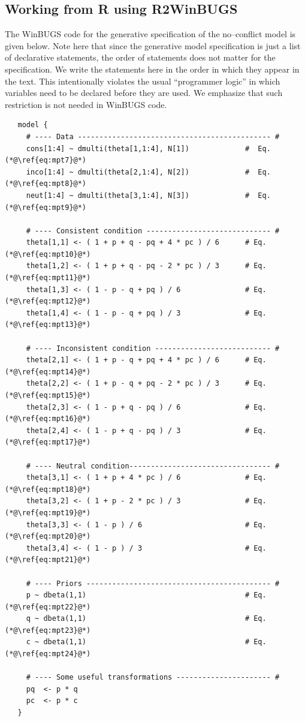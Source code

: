 \subsection{Working from R using R2WinBUGS}

The WinBUGS code for the generative specification of the no--conflict model is given below. {Note here that since the generative model specification is just a list of declarative statements, the order of statements does not matter for the specification. We write the statements here in the order in which they appear in the text. This intentionally violates the usual ``programmer logic'' in which variables need to be declared before they are used. We emphasize that such restriction is not needed in WinBUGS code.}

\begin{lstlisting}
   model {
     # ---- Data --------------------------------------------- #
     cons[1:4] ~ dmulti(theta[1,1:4], N[1])             #  Eq. (*@\ref{eq:mpt7}@*)
     inco[1:4] ~ dmulti(theta[2,1:4], N[2])             #  Eq. (*@\ref{eq:mpt8}@*)
     neut[1:4] ~ dmulti(theta[3,1:4], N[3])             #  Eq. (*@\ref{eq:mpt9}@*)
  
     # ---- Consistent condition ----------------------------- #
     theta[1,1] <- ( 1 + p + q - pq + 4 * pc ) / 6      # Eq. (*@\ref{eq:mpt10}@*)
     theta[1,2] <- ( 1 + p + q - pq - 2 * pc ) / 3      # Eq. (*@\ref{eq:mpt11}@*)
     theta[1,3] <- ( 1 - p - q + pq ) / 6               # Eq. (*@\ref{eq:mpt12}@*)
     theta[1,4] <- ( 1 - p - q + pq ) / 3               # Eq. (*@\ref{eq:mpt13}@*)
      
     # ---- Inconsistent condition --------------------------- #
     theta[2,1] <- ( 1 + p - q + pq + 4 * pc ) / 6      # Eq. (*@\ref{eq:mpt14}@*)
     theta[2,2] <- ( 1 + p - q + pq - 2 * pc ) / 3      # Eq. (*@\ref{eq:mpt15}@*)
     theta[2,3] <- ( 1 - p + q - pq ) / 6               # Eq. (*@\ref{eq:mpt16}@*)
     theta[2,4] <- ( 1 - p + q - pq ) / 3               # Eq. (*@\ref{eq:mpt17}@*)
        
     # ---- Neutral condition--------------------------------- #
     theta[3,1] <- ( 1 + p + 4 * pc ) / 6               # Eq. (*@\ref{eq:mpt18}@*)
     theta[3,2] <- ( 1 + p - 2 * pc ) / 3               # Eq. (*@\ref{eq:mpt19}@*)
     theta[3,3] <- ( 1 - p ) / 6                        # Eq. (*@\ref{eq:mpt20}@*)
     theta[3,4] <- ( 1 - p ) / 3                        # Eq. (*@\ref{eq:mpt21}@*)
        
     # ---- Priors ------------------------------------------- #
     p ~ dbeta(1,1)                                     # Eq. (*@\ref{eq:mpt22}@*)
     q ~ dbeta(1,1)                                     # Eq. (*@\ref{eq:mpt23}@*)
     c ~ dbeta(1,1)                                     # Eq. (*@\ref{eq:mpt24}@*)
    
     # ---- Some useful transformations ---------------------- #
     pq  <- p * q
     pc  <- p * c
   }
\end{lstlisting}


